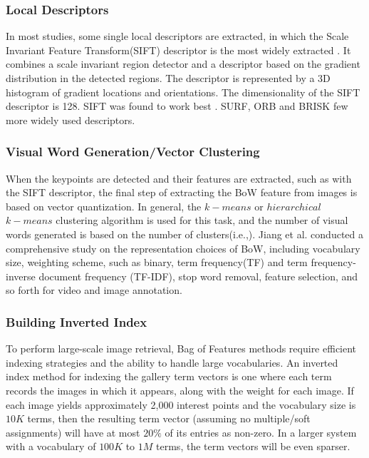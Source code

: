 \subsubsection{Local Descriptors}
In most studies, some single local descriptors are extracted, in which the Scale Invariant Feature Transform(SIFT) descriptor is the most widely extracted \cite{lowe2004distinctive}. It combines a scale invariant region detector and a descriptor based on the gradient distribution in the detected regions. The descriptor is represented by a 3D histogram of gradient locations and orientations. The dimensionality of the SIFT descriptor is 128. SIFT was found to work best 
\cite{quelhas2007thousand, mikolajczyk2005local, mikolajczyk2005performance, zhang2007local}. SURF, ORB and BRISK few more widely used descriptors.

\subsubsection{Visual Word Generation/Vector Clustering}
When the keypoints are detected and their features are extracted, such as with the SIFT descriptor, the final step of extracting the BoW feature from images is based on vector quantization. In general, the $k-means$ or $hierarchical$ $k-means$ clustering algorithm is used for this task, and the number of visual words generated is based on the number of clusters(i.e.,). Jiang et al. \cite{jiang2010representations} conducted a comprehensive study on the representation choices of BoW, including vocabulary size, weighting scheme, such as binary, term frequency(TF) and term frequency-inverse document frequency (TF-IDF), stop word removal, feature selection, and so forth for video and image annotation.

\subsubsection{Building Inverted Index}
To perform large-scale image retrieval, Bag of Features methods require efficient indexing strategies and the ability to handle large vocabularies. An inverted index method for indexing the gallery term vectors is one where each term records the images in which it appears, along with the weight for each image. If each image yields approximately 2,000 interest points and the vocabulary size is $10K$ terms, then the resulting term vector (assuming no multiple/soft assignments) will have at most $20\%$ of its entries as non-zero. In a larger system with a vocabulary of $100K$ to $1M$ terms, the term vectors will be even sparser.

